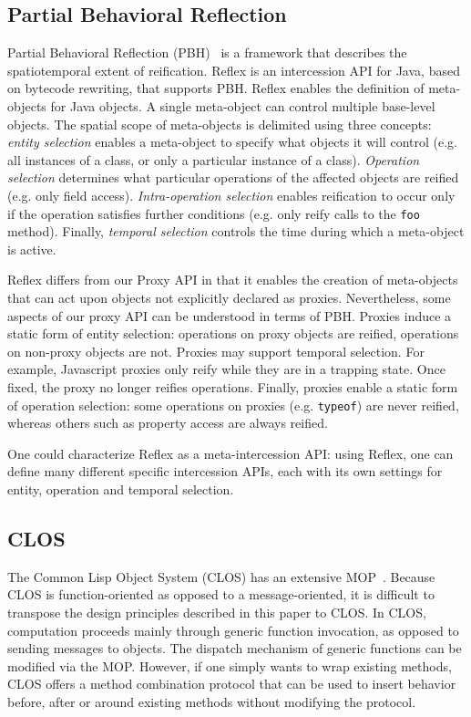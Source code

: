 \documentclass{sig-alternate}
\begin{document}
\subsection{Partial Behavioral Reflection}

Partial Behavioral Reflection (PBH)~\cite{tanter03pbh} is a framework that describes the spatiotemporal extent of reification. Reflex is an intercession API for Java, based on bytecode rewriting, that supports PBH. Reflex enables the definition of meta-objects for Java objects. A single meta-object can control multiple base-level objects. The spatial scope of meta-objects is delimited using three concepts: \emph{entity selection} enables a meta-object to specify what objects it will control (e.g. all instances of a class, or only a particular instance of a class). \emph{Operation selection} determines what particular operations of the affected objects are reified (e.g. only field access). \emph{Intra-operation selection} enables reification to occur only if the operation satisfies further conditions (e.g. only reify calls to the \texttt{foo} method). Finally, \emph{temporal selection} controls the time during which a meta-object is active.

Reflex differs from our Proxy API in that it enables the creation of meta-objects that can act upon objects not explicitly declared as proxies. Nevertheless, some aspects of our proxy API can be understood in terms of PBH. Proxies induce a static form of entity selection: operations on proxy objects are reified, operations on non-proxy objects are not. Proxies may support temporal selection. For example, Javascript proxies only reify while they are in a trapping state. Once fixed, the proxy no longer reifies operations. Finally, proxies enable a static form of operation selection: some operations on proxies (e.g. \texttt{typeof}) are never reified, whereas others such as property access are always reified.

One could characterize Reflex as a meta-intercession API: using Reflex, one can define many different specific intercession APIs, each with its own settings for entity, operation and temporal selection.

\subsection{CLOS}
\label{sub:clos}

The Common Lisp Object System (CLOS) has an extensive MOP~\cite{kiczales91art}. Because CLOS is function-oriented as opposed to a message-oriented, it is difficult to transpose the design principles described in this paper to CLOS. In CLOS, computation proceeds mainly through generic function invocation, as opposed to sending messages to objects. The dispatch mechanism of generic functions can be modified via the MOP. However, if one simply wants to wrap existing methods, CLOS offers a method combination protocol that can be used to insert behavior before, after or around existing methods without modifying the protocol.
\end{document}
